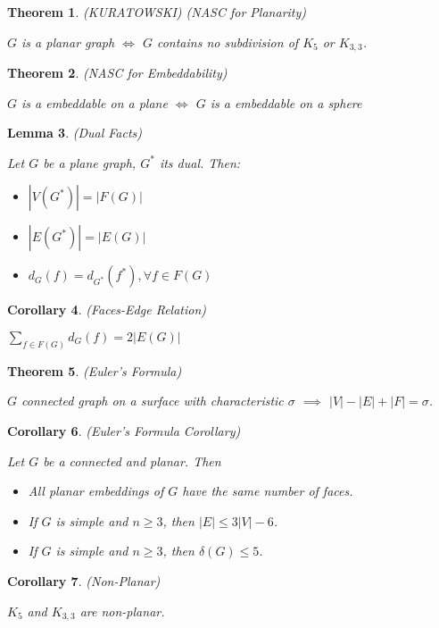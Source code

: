 \documentclass[12pt]{amsart}
\newtheorem{thm}{Theorem}
\newtheorem{lem}[thm]{Lemma}
\newtheorem{cor}[thm]{Corollary}
\theoremstyle{definition}
\begin{document}
\begin{thm} (KURATOWSKI) (NASC for Planarity)

$G$ is a planar graph $\Longleftrightarrow$ $G$ contains no subdivision of $K_5$ or $K_{3,3}$.
\end{thm}


\begin{thm} (NASC for Embeddability)

$G$ is a embeddable on a plane $\Longleftrightarrow$ $G$ is a embeddable on a sphere 
\end{thm}


\begin{lem} (Dual Facts)

Let $G$ be a plane graph, $G^*$ its dual. Then:
\begin{itemize}
  \item $|V(G^*)|=|F(G)|$
  \item $|E(G^*)|=|E(G)|$
  \item $d_G(f)=d_{G^*}(f^*), \forall f\in F(G)$
\end{itemize}

\end{lem}


\begin{cor} (Faces-Edge Relation)

$\sum_{f\in F(G)} d_G(f)=2|E(G)|$
\end{cor}


\begin{thm} (Euler's Formula)

$G$ connected graph on a surface with characteristic $\sigma$ $\implies$ $|V|-|E|+|F|=\sigma$.
\end{thm}


\begin{cor} (Euler's Formula Corollary)

Let $G$ be a connected and planar. Then
\begin{itemize}
  \item All planar embeddings of $G$ have the same number of faces.
  \item If $G$ is simple and $n\geq 3$, then $|E| \leq 3|V|-6$.
  \item If $G$ is simple and $n\geq 3$, then $\delta(G) \leq 5$.
\end{itemize}
\end{cor}


\begin{cor} (Non-Planar)

$K_5$ and $K_{3,3}$ are non-planar.
\end{cor}
\end{document}
